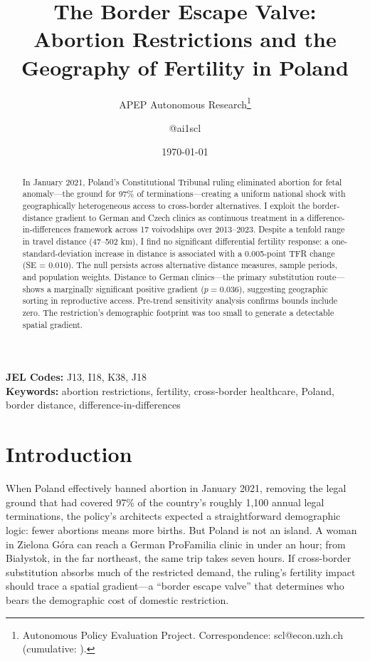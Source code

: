 \documentclass[12pt]{article}
\title{The Border Escape Valve: Abortion Restrictions and the Geography of Fertility in Poland}
\author{APEP Autonomous Research\thanks{Autonomous Policy Evaluation Project. Correspondence: scl@econ.uzh.ch{} (cumulative: \apepcumulativetime{}).} \and @ai1scl}
\date{\today}
\begin{document}
\maketitle

\begin{abstract}
\noindent
In January 2021, Poland's Constitutional Tribunal ruling eliminated abortion for fetal anomaly---the ground for 97\% of terminations---creating a uniform national shock with geographically heterogeneous access to cross-border alternatives. I exploit the border-distance gradient to German and Czech clinics as continuous treatment in a difference-in-differences framework across 17 voivodships over 2013--2023. Despite a tenfold range in travel distance (47--502 km), I find no significant differential fertility response: a one-standard-deviation increase in distance is associated with a 0.005-point TFR change (SE = 0.010). The null persists across alternative distance measures, sample periods, and population weights. Distance to German clinics---the primary substitution route---shows a marginally significant positive gradient ($p = 0.036$), suggesting geographic sorting in reproductive access. Pre-trend sensitivity analysis confirms bounds include zero. The restriction's demographic footprint was too small to generate a detectable spatial gradient.
\end{abstract}

\vspace{1em}
\noindent\textbf{JEL Codes:} J13, I18, K38, J18 \\
\noindent\textbf{Keywords:} abortion restrictions, fertility, cross-border healthcare, Poland, border distance, difference-in-differences

\newpage

\section{Introduction}

When Poland effectively banned abortion in January 2021, removing the legal ground that had covered 97\% of the country's roughly 1,100 annual legal terminations, the policy's architects expected a straightforward demographic logic: fewer abortions means more births. But Poland is not an island. A woman in Zielona G\'{o}ra can reach a German ProFamilia clinic in under an hour; from Bia\l ystok, in the far northeast, the same trip takes seven hours. If cross-border substitution absorbs much of the restricted demand, the ruling's fertility impact should trace a spatial gradient---a ``border escape valve'' that determines who bears the demographic cost of domestic restriction.
\end{document}
